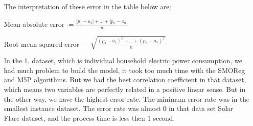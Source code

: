 \documentclass[a4paper]{article}
\begin{document}
The interpretation of these error in the table below are;

Mean absolute error $= \frac{|p_1 - a_1| + ... + |p_n - a_n|}{n}$

Root mean squared error $=\sqrt{ \frac{(p_1 - a_1)^2 + ... + (p_n - a_n)^2}{n} }$

In the 1. dataset, which is individual household electric power consumption, we had much problem to build the model, it took too much time with the SMOReg and M5P algorithms. But we had the best correlation coefficient in that dataset, which means two variables are perfectly related in a positive linear sense. But in the other way, we have the highest error rate. The minimum error rate was in the smallest instance dataset. The error rate was almost 0 in that data set Solar Flare dataset, and the process time is less then 1 second.
\end{document}
